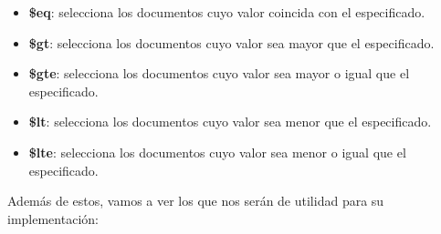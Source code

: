 \begin{itemize}\label{mongooperators}
    \item \textbf{\$eq}: selecciona los documentos cuyo valor coincida con el especificado.
    \item \textbf{\$gt}: selecciona los documentos cuyo valor sea mayor que el especificado.
    \item \textbf{\$gte}: selecciona los documentos cuyo valor sea mayor o igual que el especificado.
    \item \textbf{\$lt}: selecciona los documentos cuyo valor sea menor que el especificado.
    \item \textbf{\$lte}: selecciona los documentos cuyo valor sea menor o igual que el especificado.
\end{itemize}

Además de estos, vamos a ver los que nos serán de utilidad para su implementación:

